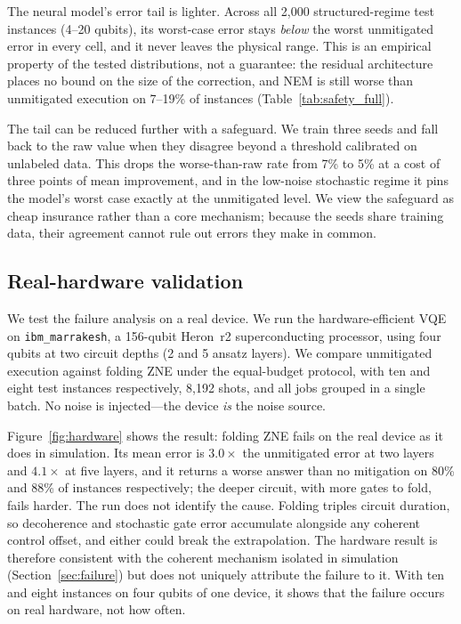 \documentclass[11pt]{article}
\begin{document}
The neural model's error tail is lighter. Across all 2{,}000 structured-regime test instances (4--20 qubits), its worst-case error stays \emph{below} the worst unmitigated error in every cell, and it never leaves the physical range. This is an empirical property of the tested distributions, not a guarantee: the residual architecture places no bound on the size of the correction, and NEM is still worse than unmitigated execution on 7--19\% of instances (Table~\ref{tab:safety_full}).

The tail can be reduced further with a safeguard. We train three seeds and fall back to the raw value when they disagree beyond a threshold calibrated on unlabeled data. This drops the worse-than-raw rate from 7\% to 5\% at a cost of three points of mean improvement, and in the low-noise stochastic regime it pins the model's worst case exactly at the unmitigated level. We view the safeguard as cheap insurance rather than a core mechanism; because the seeds share training data, their agreement cannot rule out errors they make in common.

\subsection{Real-hardware validation}
\label{sec:hardware}

We test the failure analysis on a real device. We run the hardware-efficient VQE on \texttt{ibm\_marrakesh}, a 156-qubit Heron~r2 superconducting processor, using four qubits at two circuit depths (2 and 5 ansatz layers). We compare unmitigated execution against folding ZNE under the equal-budget protocol, with ten and eight test instances respectively, 8{,}192 shots, and all jobs grouped in a single batch. No noise is injected---the device \emph{is} the noise source.

Figure~\ref{fig:hardware} shows the result: folding ZNE fails on the real device as it does in simulation. Its mean error is $3.0\times$ the unmitigated error at two layers and $4.1\times$ at five layers, and it returns a worse answer than no mitigation on 80\% and 88\% of instances respectively; the deeper circuit, with more gates to fold, fails harder. The run does not identify the cause. Folding triples circuit duration, so decoherence and stochastic gate error accumulate alongside any coherent control offset, and either could break the extrapolation. The hardware result is therefore consistent with the coherent mechanism isolated in simulation (Section~\ref{sec:failure}) but does not uniquely attribute the failure to it. With ten and eight instances on four qubits of one device, it shows that the failure occurs on real hardware, not how often.
\end{document}
